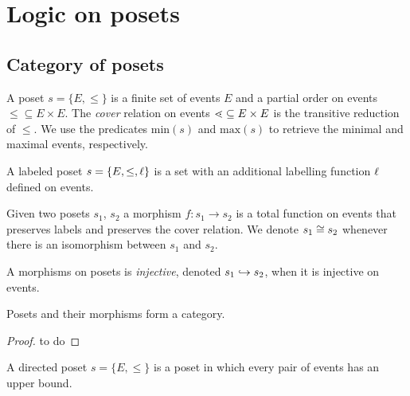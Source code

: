 \section{Logic on posets}

\subsection{Category of posets}
\label{sec:posets}

\begin{definition}[Poset]
  \label{def:poset}
  A poset $s=\{E,\leq\}$ is a finite set of events $E$ and a partial order on events $\leq\subseteq E\times E$. The \emph{cover} relation on events $\lessdot\subseteq E\times E$ is the transitive reduction of $\leq$.
  We use the predicates $\text{min}(s)$ and $\text{max}(s)$ to retrieve the minimal and maximal events, respectively.

  A labeled poset $s=\{E,\leq,\ell\}$ is a set with an additional labelling function $\ell$ defined on events.
\end{definition}

\begin{definition}
  Given two posets $s_1$, $s_2$ a morphism $f:s_1\to s_2$ is a total function on events that preserves labels and preserves the cover relation. We denote $s_1\cong s_2$ whenever there is an isomorphism between $s_1$ and $s_2$.

  A morphisms on posets is \emph{injective}, denoted $s_1\hookrightarrow s_2$, when it is injective on events.
\end{definition}

\begin{lemma}
  Posets and their morphisms form a category.
\end{lemma}
\begin{mdframed}[backgroundcolor=blue!20]
  \begin{proof}
    to do
  \end{proof}
\end{mdframed}

\begin{definition}
  A directed poset $s=\{E,\leq\}$ is a poset in which every pair of events has an upper bound.
\end{definition}


